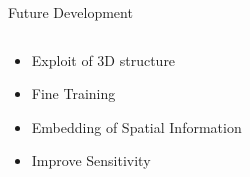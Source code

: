 \documentclass{standalone}
\begin{document}
	\begin{frame}[noframenumbering]{Future Development}
		\begin{block}{}
			\begin{columns}
				\begin{column}{.5\textwidth}
					\begin{itemize}
						\item Exploit of 3D structure
						\item Fine Training 
						\item Embedding of Spatial Information
						\item Improve Sensitivity
					\end{itemize}
				\end{column}
			\end{columns}			
		\end{block}
	\end{frame}
\end{document}
